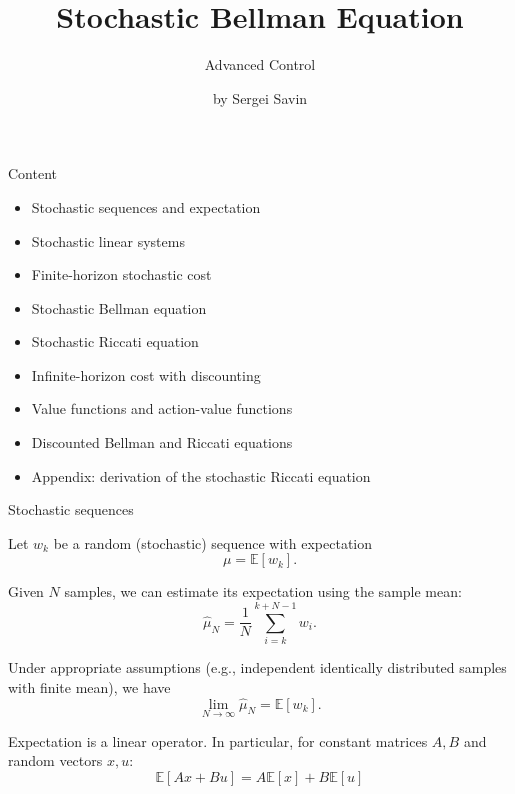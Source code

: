 \documentclass{beamer}
\subtitle{Advanced Control}
\author{by Sergei Savin}
\date{\mydate}
\title{Stochastic Bellman Equation}
\begin{document}
\maketitle


\begin{frame}{Content}
	\begin{itemize}
		\item Stochastic sequences and expectation
		\item Stochastic linear systems
		\item Finite-horizon stochastic cost
		\item Stochastic Bellman equation
		\item Stochastic Riccati equation
		\item Infinite-horizon cost with discounting
		\item Value functions and action-value functions
		\item Discounted Bellman and Riccati equations
		\item Appendix: derivation of the stochastic Riccati equation
	\end{itemize}
\end{frame}



\begin{frame}{Stochastic sequences}
	\begin{flushleft}
		

Let $w_k$ be a random (stochastic) sequence with expectation
\[
\mu = \mathbb{E}[w_k].
\]

Given $N$ samples, we can estimate its expectation using the sample mean:
\[
\hat{\mu}_N = \frac{1}{N}\sum_{i=k}^{k+N-1} w_i.
\]

Under appropriate assumptions (e.g., independent identically distributed
samples with finite mean), we have
\[
\lim_{N\to\infty}\hat{\mu}_N = \mathbb{E}[w_k].
\]

\vspace{0.3cm}

Expectation is a linear operator. In particular, for constant matrices
$A,B$ and random vectors $x,u$:
\[
\boxed{
	\mathbb{E}[Ax+Bu]
	= A\mathbb{E}[x]+B\mathbb{E}[u]
}
\]
		
	\end{flushleft}
\end{frame}
\end{document}

